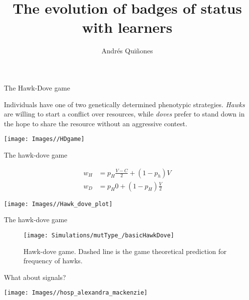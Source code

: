\documentclass[
  ignorenonframetext,
]{beamer}
\title{The evolution of badges of status with learners}
\author{Andrés Quiñones}
\date{}
\begin{document}
\frame{\titlepage}

\begin{frame}{The Hawk-Dove game}
\protect\hypertarget{the-hawk-dove-game}{}

Individuals have one of two genetically determined phenotypic
strategies. \emph{Hawks} are willing to start a conflict over resources,
while \emph{doves} prefer to stand down in the hope to share the
resource without an aggressive contest.

\begin{center}\texttt{[image: Images//HDgame]} \end{center}

\end{frame}

\begin{frame}{The hawk-dove game}
\protect\hypertarget{the-hawk-dove-game-1}{}

\begin{align*}
w_H &= p_H \frac{V-C}{2}+(1-p_h) V\\
w_D &= p_H 0 + (1-p_H)\frac{V}{2}
\end{align*} \vspace{-0.8cm}

\begin{center}\texttt{[image: Images//Hawk\_dove\_plot]} \end{center}

\end{frame}

\begin{frame}{The hawk-dove game}
\protect\hypertarget{the-hawk-dove-game-2}{}

\begin{figure}
\texttt{[image: Simulations/mutType\_/basicHawkDove]} \caption{\label{fig:HD_game}Hawk-dove game. Dashed line is the  game theoretical prediction for frequency of hawks.}\label{fig:unnamed-chunk-3}
\end{figure}

\end{frame}

\begin{frame}{What about signals?}
\protect\hypertarget{what-about-signals}{}

\begin{center}\texttt{[image: Images//hosp\_alexandra\_mackenzie]} \end{center}

\end{frame}
\end{document}
